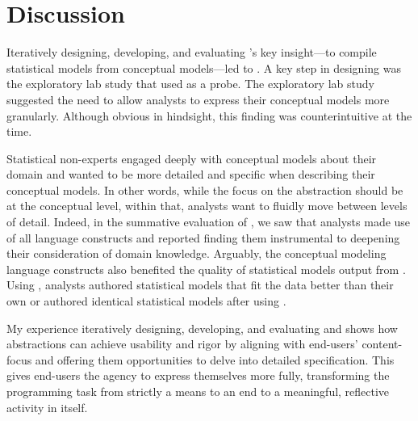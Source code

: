 \section{Discussion}
Iteratively designing, developing, and evaluating \tisane's key insight---to
compile statistical models from conceptual models---led to \rTisane. A key step
in designing \rTisane was the exploratory lab study that used \tisane as a
probe. The exploratory lab study suggested the need to allow analysts to express
their conceptual models more granularly. Although obvious in hindsight, this
finding was counterintuitive at the time. 

Statistical non-experts engaged deeply with conceptual models
about their domain and wanted to be more detailed and specific when describing
their conceptual models. In other words, while the focus on the abstraction
should be at the conceptual level, within that, analysts want to fluidly move between levels of detail. Indeed, in the summative evaluation of \rTisane,
we saw that analysts made use of all language constructs and reported finding
them instrumental to deepening their consideration of domain knowledge.
Arguably, the conceptual modeling language constructs also benefited the quality
of statistical models output from \rTisane. Using \rTisane, analysts authored
statistical models that fit the data better than their own or authored identical
statistical models after using \rTisane.

My experience iteratively designing, developing, and evaluating \tisane and
\rTisane shows how abstractions can achieve usability and rigor by aligning
with end-users' content-focus and offering them opportunities to delve into
detailed specification. This gives end-users the agency to express themselves
more fully, transforming the programming task from strictly a means to an end to
a meaningful, reflective activity in itself. 


